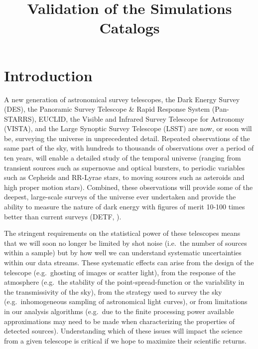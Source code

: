 \documentclass[]{article}
\begin{document}
 
\sloppy
\title
{Validation of the Simulations Catalogs}


\label{firstpage}


\maketitle 


\section{Introduction \label{sec:intro}}

A new generation of astronomical survey telescopes, the Dark Energy
Survey (DES), the Panoramic Survey Telescope \& Rapid Response System
(Pan-STARRS), EUCLID, the Visible and Infrared Survey Telescope for
Astronomy (VISTA), and the Large Synoptic Survey Telescope (LSST) are
now, or soon will be, surveying the universe in unprecedented
detail. Repeated observations of the same part of the sky, with
hundreds to thousands of observations over a period of ten years, will
enable a detailed study of the temporal universe (ranging from
transient sources such as supernovae and optical bursters, to periodic
variables such as Cepheids and RR-Lyrae stars, to moving sources such
as asteroids and high proper motion stars). Combined, these
observations will provide some of the deepest, large-scale surveys of
the universe ever undertaken and provide the ability to measure the
nature of dark energy with figures of merit 10-100 times better than
current surveys (DETF, \cite{albrecht06}).

The stringent requirements on the statistical power of these
telescopes means that we will soon no longer be limited by shot noise
(i.e.\ the number of sources within a sample) but by how well we can
understand systematic uncertainties within our data streams. These
systematic effects can arise from the design of the telescope
(e.g.\ ghosting of images or scatter light), from the response of the
atmosphere (e.g.\ the stability of the point-spread-function or the
variability in the transmissivity of the sky), from the strategy used
to survey the sky (e.g.\ inhomogeneous sampling of astronomical light
curves), or from limitations in our analysis algorithms (e.g.\ due to
the finite processing power available approximations may need to be
made when characterizing the properties of detected
sources). Understanding which of these issues will impact the science
from a given telescope is critical if we hope to maximize their
scientific returns.
\end{document}
